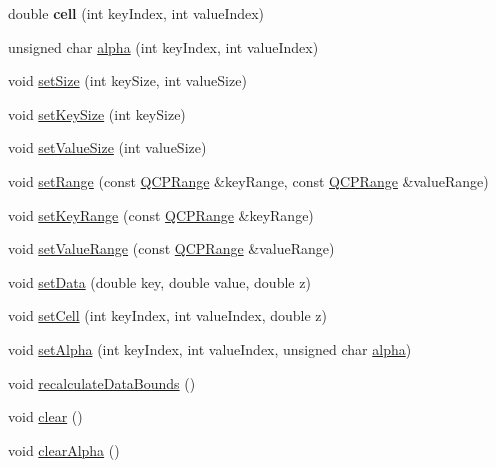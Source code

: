 \begin{DoxyCompactItemize}
\item 
double {\bfseries cell} (int key\+Index, int value\+Index)\hypertarget{classQCPColorMapData_af51ecd21f347adbf87b4cce4e1f5cbd6}{}\label{classQCPColorMapData_af51ecd21f347adbf87b4cce4e1f5cbd6}

\item 
unsigned char \hyperlink{classQCPColorMapData_a4f7e6b7a97017400cbbd46f0660e68ea}{alpha} (int key\+Index, int value\+Index)
\item 
void \hyperlink{classQCPColorMapData_a0d9ff35c299d0478b682bfbcdd9c097e}{set\+Size} (int key\+Size, int value\+Size)
\item 
void \hyperlink{classQCPColorMapData_ac7ef70e383aface34b44dbde49234b6b}{set\+Key\+Size} (int key\+Size)
\item 
void \hyperlink{classQCPColorMapData_a0893c9e3914513048b45e3429ffd16f2}{set\+Value\+Size} (int value\+Size)
\item 
void \hyperlink{classQCPColorMapData_aad9c1c7c703c1339489fc730517c83d4}{set\+Range} (const \hyperlink{classQCPRange}{Q\+C\+P\+Range} \&key\+Range, const \hyperlink{classQCPRange}{Q\+C\+P\+Range} \&value\+Range)
\item 
void \hyperlink{classQCPColorMapData_a0738c485f3c9df9ea1241b7a8bb6a86e}{set\+Key\+Range} (const \hyperlink{classQCPRange}{Q\+C\+P\+Range} \&key\+Range)
\item 
void \hyperlink{classQCPColorMapData_ada1b2680ba96a5f4175b6d341cf75d23}{set\+Value\+Range} (const \hyperlink{classQCPRange}{Q\+C\+P\+Range} \&value\+Range)
\item 
void \hyperlink{classQCPColorMapData_afd2083ccfd6987ec94aa7ef8e91ca39a}{set\+Data} (double key, double value, double z)
\item 
void \hyperlink{classQCPColorMapData_a8e75eaf8746596319032a93f3d2d0683}{set\+Cell} (int key\+Index, int value\+Index, double z)
\item 
void \hyperlink{classQCPColorMapData_aaf7de5b34c58f38d8f4c1ceb064a876c}{set\+Alpha} (int key\+Index, int value\+Index, unsigned char \hyperlink{classQCPColorMapData_a4f7e6b7a97017400cbbd46f0660e68ea}{alpha})
\item 
void \hyperlink{classQCPColorMapData_ab235ade8a4d64bd3adb26a99b3dd57ee}{recalculate\+Data\+Bounds} ()
\item 
void \hyperlink{classQCPColorMapData_a9910ba830e96955bd5c8e5bef1e77ef3}{clear} ()
\item 
void \hyperlink{classQCPColorMapData_a14d08b9c3720cd719400079b86d3906b}{clear\+Alpha} ()
\item 

\end{DoxyCompactItemize}
